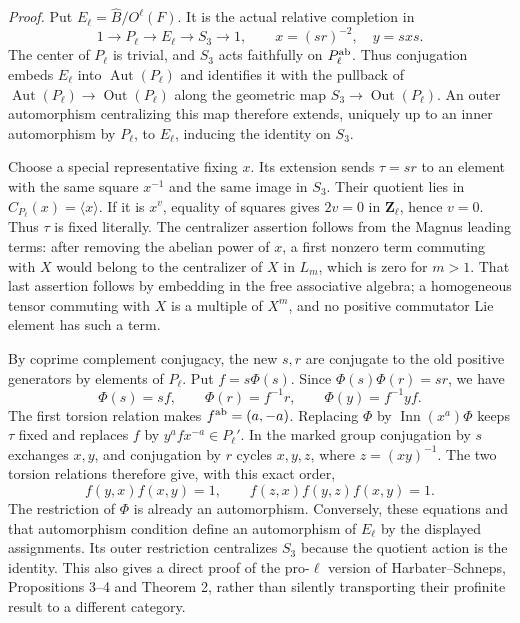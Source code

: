 \emph{Proof.}
Put $E_\ell=\widehat B/O^\ell(F)$. It is the actual relative
completion in
\[
 1\longrightarrow P_\ell\longrightarrow E_\ell
             \longrightarrow S_3\longrightarrow1,
 \qquad x=(sr)^{-2},\quad y=sxs.
\]
The center of $P_\ell$ is trivial, and $S_3$ acts faithfully on
$P_\ell^{\rm ab}$. Thus conjugation embeds $E_\ell$ into
$\operatorname{Aut}(P_\ell)$ and identifies it with the pullback
of $\operatorname{Aut}(P_\ell)\to\operatorname{Out}(P_\ell)$ along
the geometric map $S_3\to\operatorname{Out}(P_\ell)$.
An outer automorphism centralizing this map therefore extends,
uniquely up to an inner automorphism by $P_\ell$, to $E_\ell$,
inducing the identity on $S_3$.

Choose a special representative fixing $x$. Its extension sends
$\tau=sr$ to an element with the same square $x^{-1}$ and the
same image in $S_3$. Their quotient lies in $C_{P_\ell}(x)=\langle
x\rangle$. If it is $x^v$, equality of squares gives $2v=0$ in
$\mathbf Z_\ell$, hence $v=0$. Thus $\tau$ is fixed literally.
The centralizer assertion follows from the Magnus leading terms:
after removing the abelian power of $x$, a first nonzero term
commuting with $X$ would belong to the centralizer of $X$ in
$L_m$, which is zero for $m>1$. That last assertion follows by
embedding in the free associative algebra; a homogeneous tensor
commuting with $X$ is a multiple of $X^m$, and no positive
commutator Lie element has such a term.

By coprime complement conjugacy, the new $s,r$ are conjugate to
the old positive generators by elements of $P_\ell$. Put $f=s\Phi(s)$.
Since $\Phi(s)\Phi(r)=sr$, we have
\[
 \Phi(s)=sf,\qquad \Phi(r)=f^{-1}r,
 \qquad \Phi(y)=f^{-1}yf.
\]
The first torsion relation makes $f^{\rm ab}=(a,-a)$. Replacing
$\Phi$ by $\operatorname{Inn}(x^a)\Phi$ keeps $\tau$ fixed and
replaces $f$ by $y^af x^{-a}\in P_\ell'$. In the marked group
conjugation by $s$ exchanges $x,y$, and conjugation by $r$
cycles $x,y,z$, where $z=(xy)^{-1}$. The two torsion relations
therefore give, with this exact order,
\[
 f(y,x)f(x,y)=1,\qquad f(z,x)f(y,z)f(x,y)=1.
\]
The restriction of $\Phi$ is already an automorphism. Conversely,
these equations and that automorphism condition define an
automorphism of $E_\ell$ by the displayed assignments. Its outer
restriction centralizes $S_3$ because the quotient action is the
identity. This also gives a direct proof of the pro-$\ell$ version
of Harbater--Schneps, Propositions 3--4 and Theorem 2, rather than
silently transporting their profinite result to a different category.


